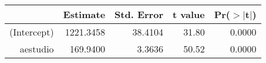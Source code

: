 \begin{table}[ht]
\centering
\begin{tabular}{rrrrr}
  \hline
 & Estimate & Std. Error & t value & Pr($>$$|$t$|$) \\ 
  \hline
(Intercept) & 1221.3458 & 38.4104 & 31.80 & 0.0000 \\ 
  aestudio & 169.9400 & 3.3636 & 50.52 & 0.0000 \\ 
   \hline
\end{tabular}
\end{table}
